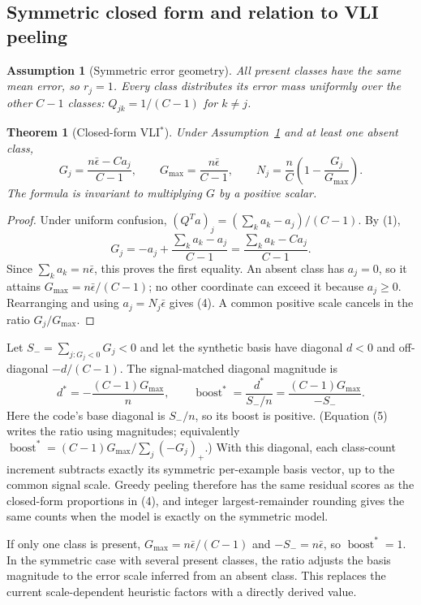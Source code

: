 \documentclass[11pt]{article}
\newtheorem{assumption}{Assumption}
\newtheorem{theorem}{Theorem}
\begin{document}
\subsection{Symmetric closed form and relation to VLI peeling}
\begin{assumption}[Symmetric error geometry]
\label{ass:symmetric}
All present classes have the same mean error, so $r_j=1$. Every class
distributes its error mass uniformly over the other $C-1$ classes:
$Q_{jk}=1/(C-1)$ for $k\ne j$.
\end{assumption}

\begin{theorem}[Closed-form VLI$^*$]
\label{thm:closed-form}
Under Assumption~\ref{ass:symmetric} and at least one absent class,
\[
 G_j=\frac{n\bar\epsilon-Ca_j}{C-1},\qquad
 G_{\max}=\frac{n\bar\epsilon}{C-1},\qquad
 N_j=\frac{n}{C}\left(1-\frac{G_j}{G_{\max}}\right). \tag{4}
\]
The formula is invariant to multiplying $G$ by a positive scalar.
\end{theorem}
\begin{proof}
Under uniform confusion, $(Q^Ta)_j=(\sum_k a_k-a_j)/(C-1)$. By (1),
\[
 G_j=-a_j+\frac{\sum_k a_k-a_j}{C-1}
     =\frac{\sum_k a_k-Ca_j}{C-1}.
\]
Since $\sum_k a_k=n\bar\epsilon$, this proves the first equality. An absent
class has $a_j=0$, so it attains $G_{\max}=n\bar\epsilon/(C-1)$; no other
coordinate can exceed it because $a_j\ge0$. Rearranging and using
$a_j=N_j\bar\epsilon$ gives (4). A common positive scale cancels in the
ratio $G_j/G_{\max}$.
\end{proof}

Let $S_- = \sum_{j:G_j<0}G_j<0$ and let the synthetic basis have diagonal
$d<0$ and off-diagonal $-d/(C-1)$. The signal-matched diagonal magnitude is
\[
 d^*=-\frac{(C-1)G_{\max}}{n},\qquad
 \operatorname{boost}^*=\frac{d^*}{S_-/n}
 =\frac{(C-1)G_{\max}}{-S_-}. \tag{5}
\]
Here the code's base diagonal is $S_-/n$, so its boost is positive. (Equation
(5) writes the ratio using magnitudes; equivalently
$\operatorname{boost}^*=(C-1)G_{\max}/\sum_j(-G_j)_+$.) With this diagonal,
each class-count increment subtracts exactly its symmetric per-example basis
vector, up to the common signal scale. Greedy peeling therefore has the same
residual scores as the closed-form proportions in (4), and integer
largest-remainder rounding gives the same counts when the model is exactly
on the symmetric model.

If only one class is present, $G_{\max}=n\bar\epsilon/(C-1)$ and
$-S_-=n\bar\epsilon$, so $\operatorname{boost}^*=1$. In the symmetric case
with several present classes, the ratio adjusts the basis magnitude to the
error scale inferred from an absent class. This replaces the current
scale-dependent heuristic factors with a directly derived value.
\end{document}
